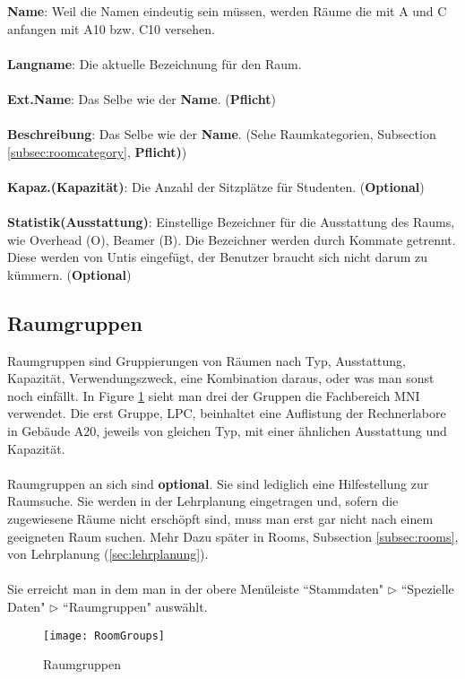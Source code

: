 \noindent
\textbf{Name}: Weil die Namen eindeutig sein müssen, werden Räume die mit A und C anfangen mit A10 bzw. C10 versehen.\\
\\
\textbf{Langname}: Die aktuelle Bezeichnung für den Raum.\\
\\
\textbf{Ext.Name}: Das Selbe wie der \textbf{Name}. (\textbf{Pflicht})\\
\\
\textbf{Beschreibung}: Das Selbe wie der \textbf{Name}. (Sehe Raumkategorien, Subsection  \ref{subsec:roomcategory}, \textbf{Pflicht)})\\
\\
\textbf{Kapaz.(Kapazität)}: Die Anzahl der Sitzplätze für Studenten. (\textbf{Optional})\\
\\
\textbf{Statistik(Ausstattung)}: Einstellige Bezeichner für die Ausstattung des Raums, wie Overhead (O), Beamer (B). Die Bezeichner werden durch Kommate getrennt. Diese werden von Untis eingefügt, der Benutzer braucht sich nicht darum zu kümmern. (\textbf{Optional})\\

\newpage
\subsection{Raumgruppen}

Raumgruppen sind Gruppierungen von Räumen nach Typ, Ausstattung, Kapazität, Verwendungszweck, eine Kombination daraus, oder was man sonst noch einfällt. In Figure \ref{fig:roomgroups} sieht man drei der Gruppen die Fachbereich MNI verwendet. Die erst Gruppe, LPC, beinhaltet eine Auflistung der Rechnerlabore in Gebäude A20, jeweils von gleichen Typ, mit einer ähnlichen Ausstattung und Kapazität.\\
\\
Raumgruppen an sich sind \textbf{optional}. Sie sind lediglich eine Hilfestellung zur Raumsuche. Sie werden in der Lehrplanung eingetragen und, sofern die zugewiesene Räume nicht erschöpft sind, muss man erst gar nicht nach einem geeigneten Raum suchen. Mehr Dazu später in Rooms, Subsection \ref{subsec:rooms}, von Lehrplanung (\ref{sec:lehrplanung}).\\
\\ 
Sie erreicht man in dem man in der obere Menüleiste ``Stammdaten" $\triangleright$ ``Spezielle Daten" $\triangleright$ ``Raumgruppen" auswählt.

\begin{figure}[h]
	\texttt{[image: RoomGroups]}
	\vspace{-15pt}
	\caption{Raumgruppen}
	\label{fig:roomgroups}
\end{figure}

